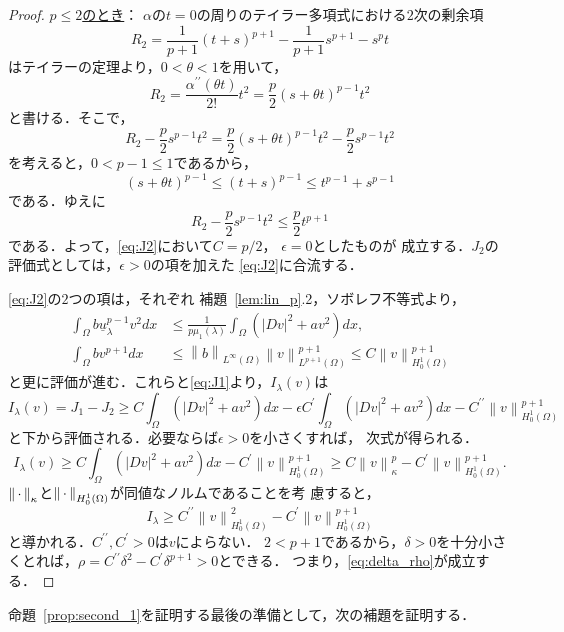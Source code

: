 \begin{proof}
 \underline{{$p \leq 2$}のとき}：
 $\alpha$の$t = 0$の周りのテイラー多項式における$2$次の剰余項
 \[
  R_2 = \frac{1}{p+1} (t+s)^{p+1} - \frac{1}{p+1} s^{p+1} -s^p t
 \]
 はテイラーの定理より，$0 < \theta < 1$を用いて，
 \[
  R_2 = \frac{\alpha^{\prime\prime}(\theta t)}{2!} t^2 = \frac{p}{2}(s
 + \theta t)^{p-1} t^2
 \]
 と書ける．そこで，
 \[
  R_2 - \frac{p}{2}s^{p-1} t^2 = \frac{p}{2}(s
 + \theta t)^{p-1} t^2 - \frac{p}{2}s^{p-1} t^2
 \]
 を考えると，$0 < p - 1 \leq 1$であるから，
 \[
  (s + \theta t)^{p-1} \leq (t+ s)^{p-1} \leq t^{p-1} + s^{p-1}
 \]
 である．ゆえに
 \[
  R_2 - \frac{p}{2}s^{p-1} t^2 \leq \frac{p}{2} t^{p+1}
 \]
 である．よって，\eqref{eq:J2}において$C = p/2$，
 $\epsilon = 0$としたものが
 成立する．$J_2$の評価式としては，$\epsilon > 0$の項を加えた
 \eqref{eq:J2}に合流する．

 \eqref{eq:J2}の$2$つの項は，それぞれ
 補題~\ref{lem:lin_p}.2，ソボレフ不等式より，
 \begin{align*}
  \int_\Omega b\underline{u}_\lambda^{p-1} v^2 dx &\leq
  \frac{1}{p\mu_1(\lambda)} \int_\Omega \left( \lvert Dv \rvert^2 +
  av^2 \right) dx, \\
  \int_\Omega bv^{p+1} dx &\leq \left\| b \right\|_{L^\infty(\Omega)}
  \left\| v \right\|_{L^{p+1}(\Omega)}^{p+1} \leq C \left\| v
  \right\|_{H_0^1(\Omega)}^{p+1}
 \end{align*}
 と更に評価が進む．これらと\eqref{eq:J1}より，$I_\lambda(v)$は
 \[
  I_\lambda(v) = J_1 - J_2 \geq C \int_\Omega \left( \lvert Dv
 \rvert^2 + a v^2 \right) dx - \epsilon C^\prime \int_\Omega \left(
 \lvert Dv \rvert^2 + av^2 \right) dx - C^{\prime\prime} \left\| v \right\|^{p+1}_{H_0^1(\Omega)}
 \]
 と下から評価される．必要ならば$\epsilon > 0$を小さくすれば，
 次式が得られる．
 \[
  I_\lambda (v) \geq C \int_\Omega \left( \lvert Dv \rvert^2 + av^2
 \right) dx - C^\prime \left\| v \right\|_{H_0^1(\Omega)}^{p+1} \geq C
 \left\| v \right\|_{\kappa}^p - C^\prime \left\| v
 \right\|^{p+1}_{H_0^1(\Omega)}.
 \]
 $\left\|\, \cdot \, \right\|_\kappa$と$\left\|\, \cdot \, \right\|_{H_0^1(\Omega)}$が同値なノルムであることを考
 慮すると，
 \[
  I_\lambda \geq C^{\prime\prime} \left\| v \right\|_{H_0^1(\Omega)}^2
 - C^{\prime} \left\| v \right\|_{H_0^1(\Omega)}^{p+1}
 \]
 と導かれる．$C^{\prime\prime}, C^\prime > 0$は$v$によらない．
 $2 < p+1$であるから，$\delta > 0$を十分小さくとれば，$\rho =
 C^{\prime\prime} \delta^2 - C^{\prime} \delta^{p+1} > 0$とできる．
 つまり，\eqref{eq:delta_rho}が成立する． \qedhere
\end{proof}

命題~\ref{prop:second_1}を証明する最後の準備として，次の補題を証明する．

